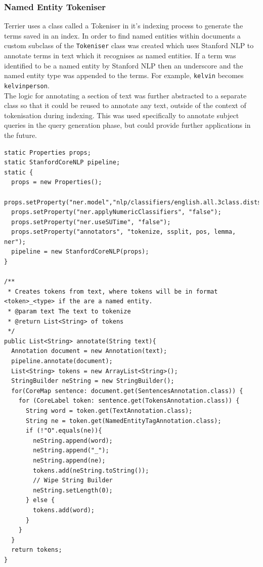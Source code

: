 \documentclass{l4proj}
\newcommand{\code}[1]{\texttt{#1}}
\newenvironment{codelisting}{\captionsetup{type=listing}}{}
\begin{document}
\subsubsection{Named Entity Tokeniser}
Terrier uses a class called a Tokeniser in it's indexing process to generate the terms saved in an index. In order to find named entities within documents a custom subclass of the \code{Tokeniser} class was created which uses Stanford NLP to annotate terms in text which it recognises as named entities.
If a term was identified to be a named entity by Stanford NLP then an underscore and the named entity type was appended to the terms. For example, 
\code{kelvin} becomes \code{kelvin\textunderscore person}. \\
The logic for annotating a section of text was further abstracted to a separate class so that it could be reused to annotate any text, outside of the context of tokenisation during indexing. This was used specifically to annotate subject queries in the query generation phase, but could provide further applications in the future.
\begin{codelisting}
\begin{verbatim}
static Properties props;
static StanfordCoreNLP pipeline;
static {
  props = new Properties();
  props.setProperty("ner.model","nlp/classifiers/english.all.3class.distsim.crf.ser.gz");
  props.setProperty("ner.applyNumericClassifiers", "false");
  props.setProperty("ner.useSUTime", "false");
  props.setProperty("annotators", "tokenize, ssplit, pos, lemma, ner");
  pipeline = new StanfordCoreNLP(props);
}
	
/**
 * Creates tokens from text, where tokens will be in format <token>_<type> if the are a named entity.
 * @param text The text to tokenize
 * @return List<String> of tokens
 */
public List<String> annotate(String text){
  Annotation document = new Annotation(text);
  pipeline.annotate(document);
  List<String> tokens = new ArrayList<String>();
  StringBuilder neString = new StringBuilder();
  for(CoreMap sentence: document.get(SentencesAnnotation.class)) {
    for (CoreLabel token: sentence.get(TokensAnnotation.class)) {
	  String word = token.get(TextAnnotation.class);
	  String ne = token.get(NamedEntityTagAnnotation.class);
	  if (!"O".equals(ne)){
	    neString.append(word);
		neString.append("_");
		neString.append(ne);
		tokens.add(neString.toString());
		// Wipe String Builder
		neString.setLength(0);
	  } else {
	    tokens.add(word);
	  }
    }
  }
  return tokens;
}
\end{verbatim}
\label{code:ne_annotation}
\end{codelisting}
\end{document}
